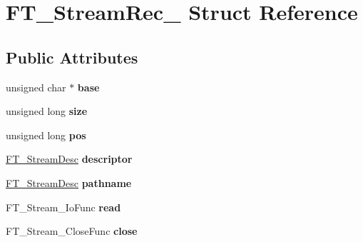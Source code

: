 \hypertarget{struct_f_t___stream_rec__}{\section{F\-T\-\_\-\-Stream\-Rec\-\_\- Struct Reference}
\label{struct_f_t___stream_rec__}
}
\subsection*{Public Attributes}
\begin{DoxyCompactItemize}
\item 
\hypertarget{struct_f_t___stream_rec___a7b406cb9a60c5a8b4bd8d04b7a23cfee}{unsigned char $\ast$ {\bfseries base}}\label{struct_f_t___stream_rec___a7b406cb9a60c5a8b4bd8d04b7a23cfee}

\item 
\hypertarget{struct_f_t___stream_rec___ab00e3cf802c950d0ca5a022a06953123}{unsigned long {\bfseries size}}\label{struct_f_t___stream_rec___ab00e3cf802c950d0ca5a022a06953123}

\item 
\hypertarget{struct_f_t___stream_rec___a5bf82c2ff4554752edfeec442fba2f33}{unsigned long {\bfseries pos}}\label{struct_f_t___stream_rec___a5bf82c2ff4554752edfeec442fba2f33}

\item 
\hypertarget{struct_f_t___stream_rec___a361c44020eace21cc453b51852d8cc4f}{\hyperlink{union_f_t___stream_desc__}{F\-T\-\_\-\-Stream\-Desc} {\bfseries descriptor}}\label{struct_f_t___stream_rec___a361c44020eace21cc453b51852d8cc4f}

\item 
\hypertarget{struct_f_t___stream_rec___afd75c5de5ed78c484a200a7e97ef5a41}{\hyperlink{union_f_t___stream_desc__}{F\-T\-\_\-\-Stream\-Desc} {\bfseries pathname}}\label{struct_f_t___stream_rec___afd75c5de5ed78c484a200a7e97ef5a41}

\item 
\hypertarget{struct_f_t___stream_rec___af724049d0258d4988c2b11c3a08b1b05}{F\-T\-\_\-\-Stream\-\_\-\-Io\-Func {\bfseries read}}\label{struct_f_t___stream_rec___af724049d0258d4988c2b11c3a08b1b05}

\item 
\hypertarget{struct_f_t___stream_rec___a7d7c7a1d7de8f580d7ad66efe89defa9}{F\-T\-\_\-\-Stream\-\_\-\-Close\-Func {\bfseries close}}\label{struct_f_t___stream_rec___a7d7c7a1d7de8f580d7ad66efe89defa9}


\end{DoxyCompactItemize}

